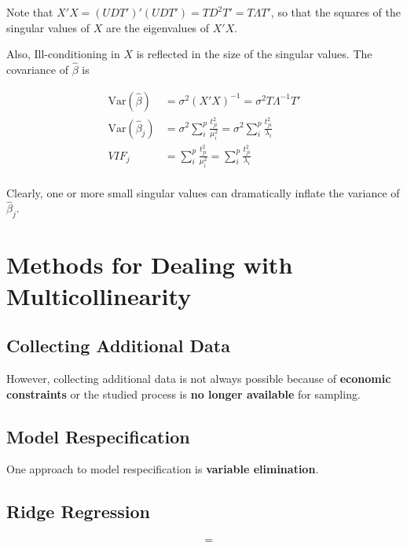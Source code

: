 \documentclass[12pt]{article}
\begin{document}
Note that $X'X = (UDT')'(UDT') = TD^2T' = T\Lambda T' $, so that the squares of the singular values of $X$ are the eigenvalues of $X'X$. 

Also, Ill-conditioning in $X$ is reflected in the size of the singular values. The covariance of $\hat{\beta}$ is

$$
\begin{aligned}
\mathrm{Var} (\hat{\beta}) &= \sigma^2 (X'X)^{-1} = \sigma^2 T \Lambda^{-1}T' \\[8pt]
\mathrm{Var} (\hat{\beta}_j) &= \sigma^2 \sum_i^p \frac{t_{ji}^2 }{\mu_i^2} = \sigma^2 \sum_i^p \frac{t_{ji}^2 }{\lambda_i}  \\[10pt]
VIF_j &= \sum_i^p \frac{t_{ji}^2 }{\mu_i^2} = \sum_i^p \frac{t_{ji}^2 }{\lambda_i}  \\[10pt]
\end{aligned}
$$

Clearly, one or more small singular values can dramatically inflate the variance of $\hat{\beta}_j$. 



\section{Methods for Dealing with Multicollinearity}

\subsection{Collecting Additional Data}

However, collecting additional data is not always possible because of \textbf{economic constraints} or the studied process is \textbf{no longer available} for sampling.


\subsection{Model Respecification}

One approach to model respecification is \textbf{variable elimination}. 


\subsection{Ridge Regression}


$$
\begin{aligned}
&= \\[8pt]
\end{aligned}
$$
\end{document}

